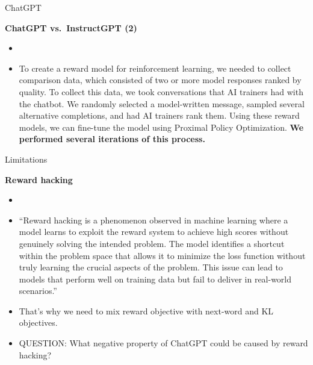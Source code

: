 \begin{vbframe}{ChatGPT}

\vfill

\textbf{ChatGPT vs.\ InstructGPT (2)}

	\begin{itemize}
		\item \href{}{}
		\item
To create a reward model for reinforcement learning, we
		needed to collect comparison data, which
		consisted of two or more model responses
		ranked by quality. To collect this data, we
		took conversations that AI trainers had with
		the chatbot. We randomly selected a
		model-written message, sampled several
		alternative completions, and had AI trainers
		rank them. Using these reward models, we can
		fine-tune the model using Proximal Policy
		Optimization. \textbf{We performed several
		iterations of this process.}
	\end{itemize}

\vfill

\end{vbframe}


\begin{vbframe}{Limitations}

\vfill

\textbf{Reward hacking}

	\begin{itemize}
		\item \href{https://medium.com/@prdeepak.babu/reward-hacking-in-large-language-models-llms-c57abbc0cde7}{}
		\item
``Reward hacking is a phenomenon observed in machine
		learning where a model learns to exploit the
		reward system to achieve high scores without
		genuinely solving the intended problem. The
		model identifies a shortcut within the
		problem space that allows it to minimize the
		loss function without truly learning the
		crucial aspects of the problem. This issue
		can lead to models that perform well on
		training data but fail to deliver in
		real-world scenarios.''
                \item That's why we need to mix reward
		objective with next-word and KL objectives.
\item QUESTION: What negative property of ChatGPT
		could be caused by reward hacking?
	\end{itemize}

\vfill

\end{vbframe}

